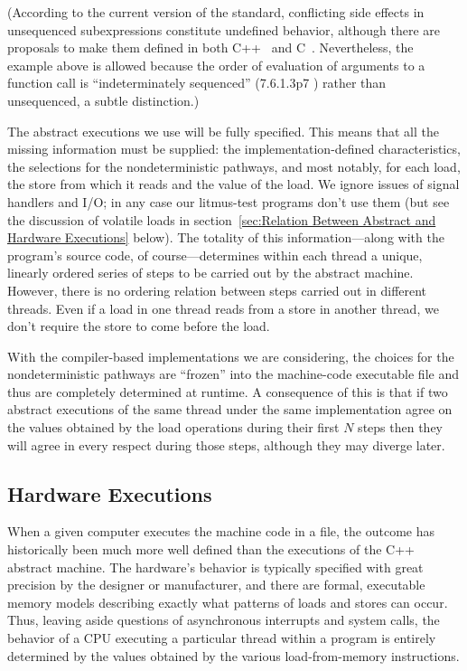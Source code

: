 \documentclass[10]{article}
\begin{document}
(According to the current version of the standard, conflicting side effects
in unsequenced subexpressions constitute undefined behavior,
although there are proposals to make them defined in both
C++~\cite{GabrielDosReis2016P0145r3}
and C~\cite{AlexCeleste2023N3203}.
Nevertheless, the example above is allowed because the order of evaluation
of arguments to a function call is ``indeterminately sequenced''
(7.6.1.3p7 ) rather than unsequenced, a subtle distinction.)

\medskip

The abstract executions we use will be fully specified.
This means that all the missing information must be supplied:
the implementation-defined characteristics, the selections for the
nondeterministic pathways, and most notably, for each load, the store
from which it reads and the value of the load.
We ignore issues of signal handlers and I/O;
in any case our litmus-test programs don't use them
(but see the discussion of volatile loads in
section~\ref{sec:Relation Between Abstract and Hardware Executions} below).
The totality of this information---along with the program's source
code, of course---determines within each thread a unique, linearly
ordered series of steps to be carried out by the abstract machine.
However, there is no ordering relation between steps carried out
in different threads.  Even if a load in one thread reads from a
store in another thread, we don't require the store to come before
the load.

With the compiler-based implementations we are considering,
the choices for the nondeterministic pathways are ``frozen'' into the
machine-code executable file and thus are completely determined
at runtime.
A consequence of this is that if two abstract executions of the same
thread under the same implementation agree on the values obtained by
the load operations during their first $N$ steps then they will agree
in every respect during those steps, although they may diverge later.

\subsection{Hardware Executions}
\label{sec:Hardware Executions}

When a given computer executes the machine code in a file, the outcome
has historically been much more well defined than the executions of the
C++ abstract machine.
The hardware's behavior is typically specified with great precision by
the designer or manufacturer, and there are formal, executable memory models
describing exactly what patterns of loads and stores can occur.
Thus, leaving aside questions of asynchronous interrupts and system
calls, the behavior of a CPU executing a particular thread within a
program is entirely determined by the values obtained by the various
load-from-memory instructions.
\end{document}
